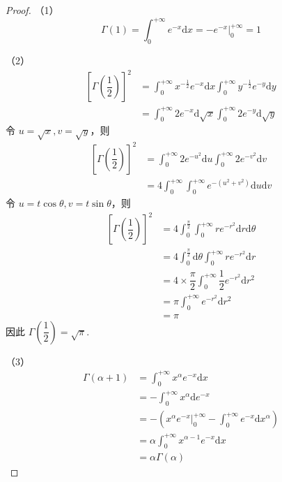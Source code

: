 \begin{proof}
    （1）
    $$
    \Gamma(1) = \int_{0}^{+\infty} e^{-x} \text{d}x = -e^{-x} \Big|_0^{+\infty} = 1
    $$

    （2）
    $$
    \begin{aligned}
        \left[ \Gamma(\dfrac{1}{2}) \right]^2 &= \int_{0}^{+\infty} x^{-\frac{1}{2}} e^{-x} \text{d}x \int_{0}^{+\infty} y^{-\frac{1}{2}} e^{-y} \text{d}y \\
        &= \int_{0}^{+\infty} 2 e^{-x} \text{d} \sqrt{x} \int_{0}^{+\infty} 2 e^{-y} \text{d} \sqrt{y}
    \end{aligned}
    $$
    令 $u = \sqrt{x}, v = \sqrt{y}$，则
    $$
    \begin{aligned}
        \left[ \Gamma(\dfrac{1}{2}) \right]^2 &= \int_{0}^{+\infty} 2 e^{-u^2} \text{d}u \int_{0}^{+\infty} 2 e^{-v^2} \text{d}v \\
        &= 4 \int_{0}^{+\infty} \int_{0}^{+\infty} e^{-(u^2 + v^2)} \text{d}u \text{d}v
    \end{aligned}
    $$
    令 $u = t \cos\theta, v = t \sin\theta$，则
    $$
    \begin{aligned}
        \left[ \Gamma(\dfrac{1}{2}) \right]^2 &= 4 \int_{0}^{\frac{\pi}{2}} \int_{0}^{+\infty} r e^{-r^2} \text{d}r \text{d} \theta \\
        &= 4 \int_{0}^{\frac{\pi}{2}} \text{d} \theta \int_{0}^{+\infty} r e^{-r^2} \text{d}r \\
        &= 4 \times \dfrac{\pi}{2} \int_{0}^{+\infty} \dfrac{1}{2} e^{-r^2} \text{d}r^2 \\
        &= \pi \int_{0}^{+\infty} e^{-r^2} \text{d}r^2 \\
        &= \pi
    \end{aligned}
    $$
    因此 $\Gamma(\dfrac{1}{2}) = \sqrt{\pi}$.

    \vspace{0.5em}

    （3）
    $$
    \begin{aligned}
        \Gamma(\alpha + 1) &= \int_{0}^{+\infty} x^{\alpha} e^{-x} \text{d}x \\
        &= -\int_{0}^{+\infty} x^{\alpha} \text{d} e^{-x} \\
        &= -\left( x^{\alpha} e^{-x} \Big|_0^{+\infty} - \int_{0}^{+\infty} e^{-x} \text{d} x^{\alpha} \right) \\
        &= \alpha \int_{0}^{+\infty} x^{\alpha - 1} e^{-x} \text{d}x \\
        &= \alpha \Gamma(\alpha)
    \end{aligned}
    $$

    \vspace{-1.5em}
\end{proof}

